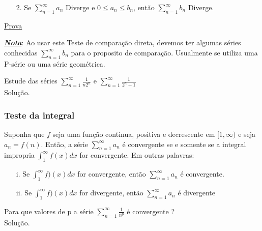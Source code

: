 \begin{ex}
\begin{itemize}
	\item[2.]Se $\sum_{n=1}^{\infty}a_{n}$ Diverge e $0\leq a_{n}\leq b_{n}$, então $\sum_{n=1}^{\infty}b_{n}$ Diverge.
\end{itemize}
\underline{Prova}\\
\vspace*{5cm}

\textbf{\textit{\underline{Nota}}}: Ao usar este Teste de comparação direta, devemos  ter algumas séries conhecidas $\sum_{n=1}^{\infty}b_{n}$ para o proposito de comparação. Usualmente se utiliza uma P-série ou uma série geométrica.

\begin{ex}
	Estude das séries $\sum_{n=1}^{\infty}\frac{1}{n2^{n}}$ e  $\sum_{n=1}^{\infty}\frac{1}{2^{n}+1}$\\
	Solução.
\end{ex}
\vspace*{5cm}
\subsubsection{Teste da integral}
Suponha que $f$ seja uma função continua, positiva e decrescente em $[1,\infty)$ e seja $a_{n}=f(n)$. Então, a série $\sum_{n=1}^{\infty}a_{n}$ é convergente se e somente se a integral impropria $\int_{1}^{\infty}f(x)dx$ for convergente. Em outras palavras:\\

\begin{itemize}
	\item[i.] Se $\int_{1}^{\infty}f)(x)dx$ for convergente, então $\sum_{n=1}^{\infty}a_{n}$ é convergente.
	\item[ii.] Se $\int_{1}^{\infty}f)(x)dx$ for divergente, então $\sum_{n=1}^{\infty}a_{n}$ é divergente
\end{itemize}
\begin{ex}
	Para que valores de p a série $\sum_{n=1}^{\infty}\frac{1}{n^{p}}$ é convergente ?\\
	Solução.
\end{ex}
\vspace*{8cm}

\end{ex}
